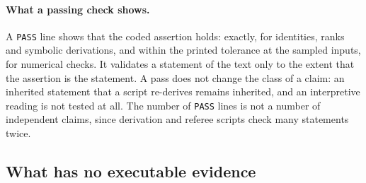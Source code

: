 \paragraph{What a passing check shows.} A \texttt{PASS} line shows that the coded assertion holds: exactly, for identities, ranks and symbolic
derivations, and within the printed tolerance at the sampled inputs, for numerical checks. It validates a statement of the text only to the
extent that the assertion is the statement. A pass does not change the class of a claim: an inherited statement that a script re-derives
remains inherited, and an interpretive reading is not tested at all. The number of \texttt{PASS} lines is not a number of independent claims,
since derivation and referee scripts check many statements twice.

\subsection{What has no executable evidence}

